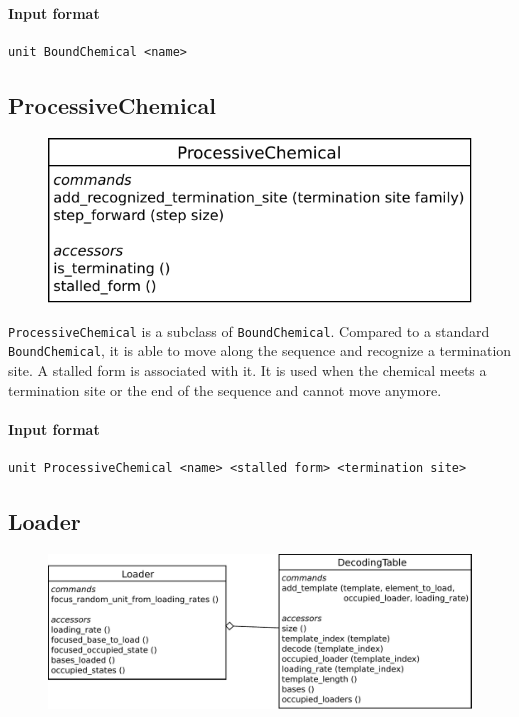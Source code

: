 \documentclass[12pt]{article}
\theoremstyle{definition}
\theoremstyle{remark}
\numberwithin{equation}{section}
\begin{document}
\paragraph{Input format}
\begin{verbatim}
unit BoundChemical <name>
\end{verbatim}

\subsection{ProcessiveChemical}

\begin{figure}[!ht]
	\centering
	\includegraphics[scale=0.8]{processivechemical}
\end{figure}

\texttt{ProcessiveChemical} is a subclass of \texttt{BoundChemical}. Compared to a standard \texttt{BoundChemical}, it is able to move along the sequence and recognize a termination site. A stalled form is associated with it. It is used when the chemical meets a termination site or the end of the sequence and cannot move anymore.

\paragraph{Input format}
\begin{verbatim}
unit ProcessiveChemical <name> <stalled form> <termination site>
\end{verbatim}


\subsection{Loader}

\begin{figure}[!ht]
	\centering
	\includegraphics[scale=0.8]{loader}
\end{figure}
\end{document}
